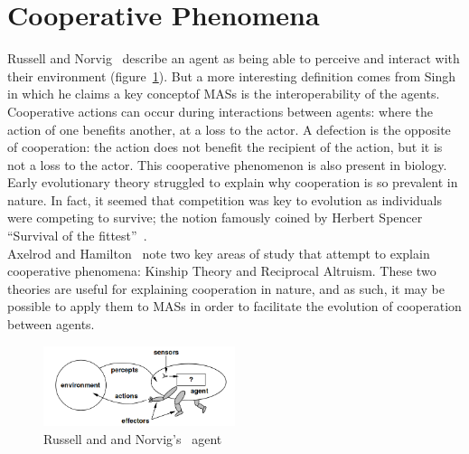 \documentclass[]{final_report}
\begin{document}
\section{Cooperative Phenomena}
Russell and Norvig~\cite{russell2016artificial} describe an agent as being able to perceive and interact with their environment (figure~\ref{fig:rnagent}). But a more interesting definition comes from Singh~\cite{singh1998agent} in which he claims a key conceptof MASs is the interoperability of the agents. Cooperative actions can occur during interactions between agents: where the action of one benefits another, at a loss to the actor. A defection is the opposite of cooperation: the action does not benefit the recipient of the action, but it is not a loss to the actor. This cooperative phenomenon is also present in biology.\\
Early evolutionary theory struggled to explain why cooperation is so prevalent in nature. In fact, it seemed that competition was key to evolution as individuals were competing to survive; the notion famously coined by Herbert Spencer ``Survival of the fittest''~\cite{spencer1864principles}.\\
Axelrod and Hamilton~\cite{evolution_of_cooperation} note two key areas of study that attempt to explain cooperative phenomena: Kinship Theory and Reciprocal Altruism. These two theories are useful for explaining cooperation in nature, and as such, it may be possible to apply them to MASs in order to facilitate the evolution of cooperation between agents.
\begin{figure}
	\center
	\includegraphics[width=0.5\textwidth]{russellnorvigagent.png}
	\caption{Russell and and Norvig's~\cite{russell2016artificial} agent}
	\label{fig:rnagent}
\end{figure}
\end{document}
